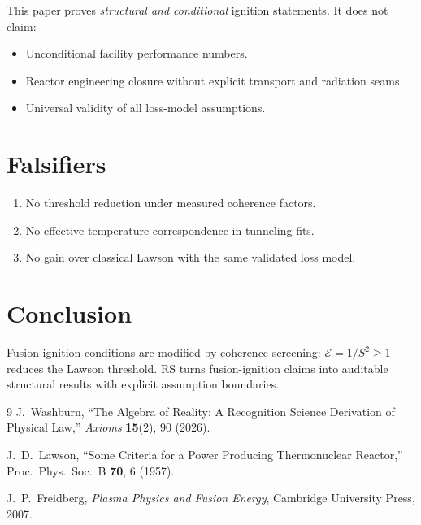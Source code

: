 \documentclass[12pt,a4paper]{article}
\theoremstyle{definition}
\theoremstyle{remark}
\begin{document}
This paper proves \emph{structural and conditional} ignition
statements.  It does not claim:
\begin{itemize}
  \item Unconditional facility performance numbers.
  \item Reactor engineering closure without explicit transport and
  radiation seams.
  \item Universal validity of all loss-model assumptions.
\end{itemize}

\section{Falsifiers}

\begin{enumerate}
  \item No threshold reduction under measured coherence factors.
  \item No effective-temperature correspondence in tunneling fits.
  \item No gain over classical Lawson with the same validated loss
  model.
\end{enumerate}

\section{Conclusion}

Fusion ignition conditions are modified by coherence screening:
$\mathcal{E} = 1/S^2 \geq 1$ reduces the Lawson threshold.  RS turns
fusion-ignition claims into auditable structural results with
explicit assumption boundaries.

\begin{thebibliography}{9}
J.~Washburn, ``The Algebra of Reality: A Recognition Science Derivation
of Physical Law,'' \emph{Axioms} \textbf{15}(2), 90 (2026).

J.~D.~Lawson, ``Some Criteria for a Power Producing Thermonuclear
Reactor,'' Proc.\ Phys.\ Soc.\ B \textbf{70}, 6 (1957).

J.~P.~Freidberg, \emph{Plasma Physics and Fusion Energy},
Cambridge University Press, 2007.
\end{thebibliography}
\end{document}
